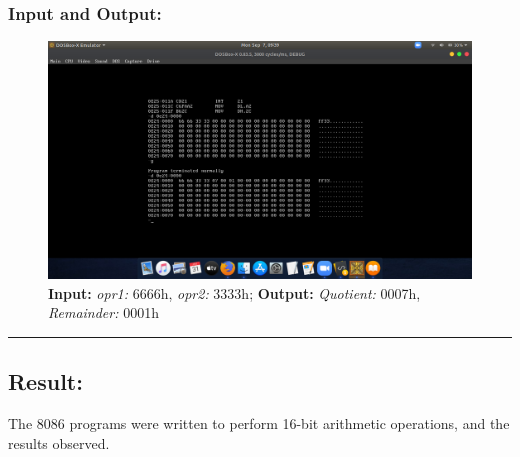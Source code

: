 \documentclass[12pt,a4paper]{article}
\begin{document}
\begin{flushleft}
\subsubsection*{\textbf{Input and Output:}}
\begin{figure}[h]
    \centering
    \includegraphics[trim = 100mm 75mm 100mm 70mm, clip, width = \textwidth]{DivisionIO.png}
    \caption{ \textbf{Input:} \emph{opr1:} 6666h, \emph{opr2:} 3333h; 
              \textbf{Output:} \emph{Quotient:} 0007h, \emph{Remainder:} 0001h}
\end{figure}

\hrule
\subsection*{\textbf{Result:}}
The 8086 programs were written to perform 16-bit arithmetic operations, and the results observed.
\end{flushleft}
\end{document}
